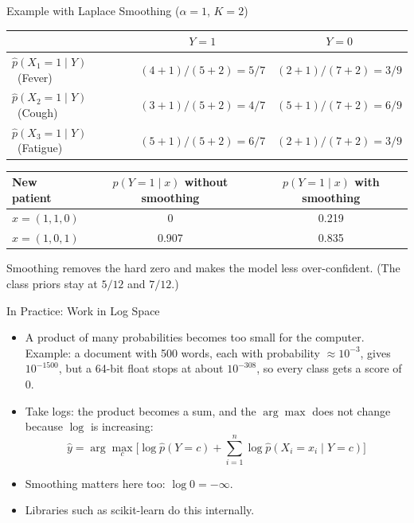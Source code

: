 \documentclass[aspectratio=169]{beamer}
\begin{document}
\begin{frame}{Example with Laplace Smoothing ($\alpha=1$, $K=2$)}
\centering
\begin{tabular}{lcc}
\toprule
 & $Y=1$ & $Y=0$ \\
\midrule
$\hat p(X_1=1\mid Y)$ \ (Fever)   & $(4+1)/(5+2) = 5/7$ & $(2+1)/(7+2) = 3/9$ \\
$\hat p(X_2=1\mid Y)$ \ (Cough)   & $(3+1)/(5+2) = 4/7$ & $(5+1)/(7+2) = 6/9$ \\
$\hat p(X_3=1\mid Y)$ \ (Fatigue) & $(5+1)/(5+2) = 6/7$ & $(2+1)/(7+2) = 3/9$ \\
\bottomrule
\end{tabular}

\vspace{0.4cm}
\begin{tabular}{lcc}
\toprule
New patient & $p(Y=1\mid x)$ without smoothing & $p(Y=1\mid x)$ with smoothing \\
\midrule
$x=(1,1,0)$ & 0     & 0.219 \\
$x=(1,0,1)$ & 0.907 & 0.835 \\
\bottomrule
\end{tabular}

\vspace{0.4cm}
\raggedright
Smoothing removes the hard zero and makes the model less over-confident.
(The class priors stay at $5/12$ and $7/12$.)
\end{frame}

\begin{frame}{In Practice: Work in Log Space}
\begin{itemize}
  \item A product of many probabilities becomes too small for the computer.\\
  Example: a document with 500 words, each with probability $\approx 10^{-3}$, gives $10^{-1500}$,
  but a 64-bit float stops at about $10^{-308}$, so every class gets a score of $0$.
  \item Take logs: the product becomes a sum, and the $\arg\max$ does not change because $\log$ is increasing:
  \[
    \hat y = \arg\max_c \Big[\log \hat p(Y=c) + \sum_{i=1}^n \log \hat p(X_i=x_i\mid Y=c)\Big]
  \]
  \item Smoothing matters here too: $\log 0 = -\infty$.
  \item Libraries such as scikit-learn do this internally.
\end{itemize}
\end{frame}
\end{document}
